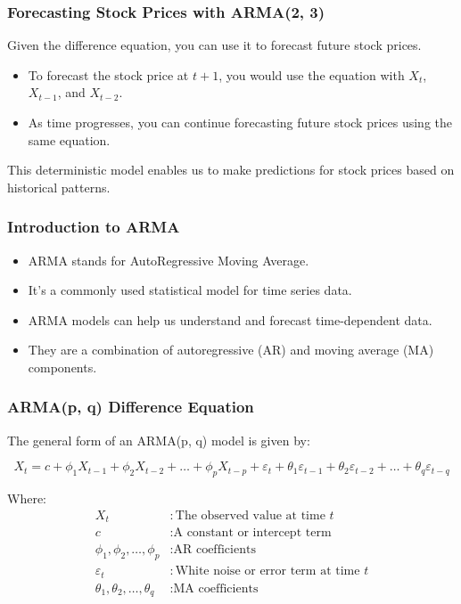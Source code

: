 \begin{frame}
	\frametitle{Forecasting Stock Prices with ARMA(2, 3)}
	
	Given the difference equation, you can use it to forecast future stock prices.
	
	\begin{itemize}
		\item To forecast the stock price at $t+1$, you would use the equation with $X_t$, $X_{t-1}$, and $X_{t-2}$.
		\item As time progresses, you can continue forecasting future stock prices using the same equation.
	\end{itemize}
	
	This deterministic model enables us to make predictions for stock prices based on historical patterns.
	
\end{frame}

	
	\begin{frame}
		\frametitle{Introduction to ARMA}
		
		\begin{itemize}
			\item ARMA stands for AutoRegressive Moving Average.
			\item It's a commonly used statistical model for time series data.
			\item ARMA models can help us understand and forecast time-dependent data.
			\item They are a combination of autoregressive (AR) and moving average (MA) components.
		\end{itemize}
		
	\end{frame}
	
	\begin{frame}
		\frametitle{ARMA(p, q) Difference Equation}
		
		The general form of an ARMA(p, q) model is given by:
		
		\[
		X_t = c + \phi_1 X_{t-1} + \phi_2 X_{t-2} + \ldots + \phi_p X_{t-p} + \varepsilon_t + \theta_1 \varepsilon_{t-1} + \theta_2 \varepsilon_{t-2} + \ldots + \theta_q \varepsilon_{t-q}
		\]
		
		Where:
		\begin{align*}
		X_t & : \text{The observed value at time } t \\
		c & : \text{A constant or intercept term} \\
		\phi_1, \phi_2, \ldots, \phi_p & : \text{AR coefficients} \\
		\varepsilon_t & : \text{White noise or error term at time } t \\
		\theta_1, \theta_2, \ldots, \theta_q & : \text{MA coefficients}
		\end{align*}
		
	\end{frame}
	
